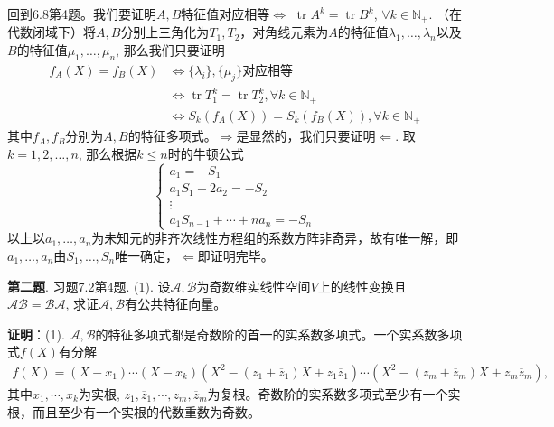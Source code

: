{回到6.8第4题。我们要证明$A, B$特征值对应相等$\Longleftrightarrow$ $\operatorname{tr} A^k = \operatorname{tr} B^k$, $\forall k \in \mathbb{N}_+$. （在代数闭域下）将$A,B$分别上三角化为$T_1, T_2$，对角线元素为$A$的特征值$\lambda_1,\ldots,\lambda_n$以及$B$的特征值$\mu_1,\ldots,\mu_n$, 那么我们只要证明
\begin{align*}
f_A(X) = f_B(X) & \Longleftrightarrow \{\lambda_i\}, \{\mu_j\}\text{对应相等} \\
& \Longleftrightarrow \operatorname{tr} T_1^k = \operatorname{tr} T_2^k, \forall k \in \mathbb{N}_+ \\
& \Longleftrightarrow S_k(f_A(X)) = S_k(f_B(X)), \forall k \in \mathbb{N}_+
\end{align*}
其中$f_A, f_B$分别为$A,B$的特征多项式。$\Longrightarrow$是显然的，我们只要证明$\Longleftarrow$. 取$k = 1, 2, \ldots, n$, 那么根据$k \leqslant n$时的牛顿公式
$$
\begin{cases}
a_1 = -S_1 \\
a_1S_1 + 2a_2 = -S_2 \\
\vdots \\
a_1S_{n-1} + \cdots + na_n = -S_n
\end{cases}
$$
以上以$a_1,\ldots,a_n$为未知元的非齐次线性方程组的系数方阵非奇异，故有唯一解，即$a_1,\ldots,a_n$由$S_1,\ldots,S_n$唯一确定，$\Longleftarrow$即证明完毕。


\newpageorvspace


{\bf 第二题}. 习题7.2第4题. (1). 设$\mathscr{A,B}$为奇数维实线性空间$V$上的线性变换且$\mathscr{AB} = \mathscr{BA}$, 求证$\mathscr{A,B}$有公共特征向量。


{\bf 证明}：(1). $\mathscr{A,B}$的特征多项式都是奇数阶的首一的实系数多项式。一个实系数多项式$f(X)$有分解
\begin{multline*}
f(X) = (X-x_1) \cdots (X-x_k) (X^2 - (z_1+\overline{z}_1)X + z_1\overline{z}_1) \cdots (X^2 - (z_m+\overline{z}_m)X + z_m\overline{z}_m),
\end{multline*}
其中$x_1, \cdots, x_k$为实根, $z_1, \overline{z}_1, \cdots, z_m, \overline{z}_m$为复根。奇数阶的实系数多项式至少有一个实根，而且至少有一个实根的代数重数为奇数。

}
